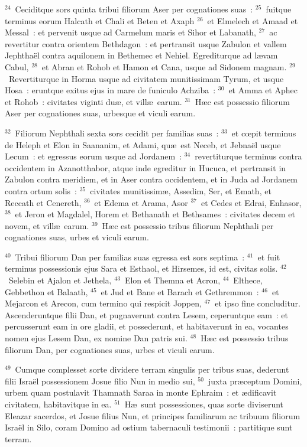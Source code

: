 ${}^{24}$~Ceciditque sors quinta tribui filiorum Aser per cognationes suas~:
${}^{25}$~fuitque terminus eorum Halcath et Chali et Beten et Axaph
${}^{26}$~et Elmelech et Amaad et Messal~: et pervenit usque ad Carmelum maris et Sihor et Labanath,
${}^{27}$~ac revertitur contra orientem Bethdagon~: et pertransit usque Zabulon et vallem Jephtha\"el contra aquilonem in Bethemec et Nehiel. Egrediturque ad l\ae vam Cabul,
${}^{28}$~et Abran et Rohob et Hamon et Cana, usque ad Sidonem magnam.
${}^{29}$~Revertiturque in Horma usque ad civitatem munitissimam Tyrum, et usque Hosa~: eruntque exitus ejus in mare de funiculo Achziba~:
${}^{30}$~et Amma et Aphec et Rohob~: civitates viginti du\ae , et vill\ae\ earum.
${}^{31}$~H\ae c est possessio filiorum Aser per cognationes suas, urbesque et viculi earum.


${}^{32}$~Filiorum Nephthali sexta sors cecidit per familias suas~:
${}^{33}$~et cœpit terminus de Heleph et Elon in Saananim, et Adami, qu\ae\ est Neceb, et Jebna\"el usque Lecum~: et egressus eorum usque ad Jordanem~:
${}^{34}$~revertiturque terminus contra occidentem in Azanotthabor, atque inde egreditur in Hucuca, et pertransit in Zabulon contra meridiem, et in Aser contra occidentem, et in Juda ad Jordanem contra ortum solis~:
${}^{35}$~civitates munitissim\ae , Assedim, Ser, et Emath, et Reccath et Cenereth,
${}^{36}$~et Edema et Arama, Asor
${}^{37}$~et Cedes et Edrai, Enhasor,
${}^{38}$~et Jeron et Magdalel, Horem et Bethanath et Bethsames~: civitates decem et novem, et vill\ae\ earum.
${}^{39}$~H\ae c est possessio tribus filiorum Nephthali per cognationes suas, urbes et viculi earum.


${}^{40}$~Tribui filiorum Dan per familias suas egressa est sors septima~:
${}^{41}$~et fuit terminus possessionis ejus Sara et Esthaol, et Hirsemes, id est, civitas solis.
${}^{42}$~Selebin et Ajalon et Jethela,
${}^{43}$~Elon et Themna et Acron,
${}^{44}$~Elthece, Gebbethon et Balaath,
${}^{45}$~et Jud et Bane et Barach et Gethremmon~:
${}^{46}$~et Mejarcon et Arecon, cum termino qui respicit Joppen,
${}^{47}$~et ipso fine concluditur. Ascenderuntque filii Dan, et pugnaverunt contra Lesem, ceperuntque eam~: et percusserunt eam in ore gladii, et possederunt, et habitaverunt in ea, vocantes nomen ejus Lesem Dan, ex nomine Dan patris sui.
${}^{48}$~H\ae c est possessio tribus filiorum Dan, per cognationes suas, urbes et viculi earum.


${}^{49}$~Cumque complesset sorte dividere terram singulis per tribus suas, dederunt filii Isra\"el possessionem Josue filio Nun in medio sui,
${}^{50}$~juxta pr\ae ceptum Domini, urbem quam postulavit Thamnath Saraa in monte Ephraim~: et \ae dificavit civitatem, habitavitque in ea.
${}^{51}$~H\ae\ sunt possessiones, quas sorte diviserunt Eleazar sacerdos, et Josue filius Nun, et principes familiarum ac tribuum filiorum Isra\"el in Silo, coram Domino ad ostium tabernaculi testimonii~: partitique sunt terram.

